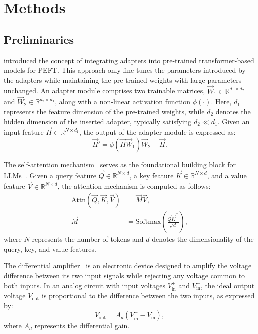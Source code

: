 \section{Methods}

\subsection{Preliminaries}

\citet{houlsby2019adapter} introduced the concept of integrating adapters into pre-trained transformer-based models for PEFT. 
This approach only fine-tunes the parameters introduced by the adapters while maintaining the pre-trained weights with large parameters unchanged.
An adapter module comprises two trainable matrices, $\vec{W}_1 \in \mathbb{R}^{d_1 \times d_2}$ and $\vec{W}_2 \in \mathbb{R}^{d_2 \times d_1}$, along with a non-linear activation function  $\phi(\cdot)$. 
Here, $d_1$ represents the feature dimension of the pre-trained weights, while $d_2$ denotes the hidden dimension of the inserted adapter, typically satisfying $d_2 \ll d_1$.
Given an input feature $\vec{H} \in \mathbb{R}^{N \times d_1}$, the output of the adapter module is expressed as:
\begin{equation}
    \vec{H}' = \phi(\vec{H}\vec{W}_1)\vec{W}_2 + \vec{H}.
\label{eq:adapter}
\end{equation}

The self-attention mechanism~\cite{vaswani2017attention} serves as the foundational building block for LLMs~\cite{openai2023gpt4, dubey2024llama3, yang2024qwen2_5, liu2024deepseekv3}. 
Given a query feature $\vec{Q} \in \mathbb{R}^{N \times d}$, a key feature $\vec{K} \in \mathbb{R}^{N \times d}$, and a value feature $\vec{V} \in \mathbb{R}^{N \times d}$, the attention mechanism is computed as follows:  
\begin{align}
    \mathrm{Attn}(\vec{Q}, \vec{K}, \vec{V}) &= \vec{M}\vec{V}, \nonumber\\
    \vec{M} &= \mathrm{Softmax}\left(\frac{\vec{Q}\vec{K}^{\top}}{\sqrt{d}}\right),
\label{eq:attn}
\end{align}
where $N$ represents the number of tokens and $d$ denotes the dimensionality of the query, key, and value features.

The differential amplifier~\cite{sansen2007analog} is an electronic device designed to amplify the voltage difference between its two input signals while rejecting any voltage common to both inputs. 
In an analog circuit with input voltages $V_{\text{in}}^{+}$ and $V_{\text{in}}^{-}$, the ideal output voltage $V_{\text{out}}$ is proportional to the difference between the two inputs, as expressed by:  
\begin{equation}  
    V_{\text{out}} = A_{d} (V_{\text{in}}^{+} - V_{\text{in}}^{-}),  
\label{eq:diffamp}  
\end{equation}  
where $A_{d}$ represents the differential gain. 

